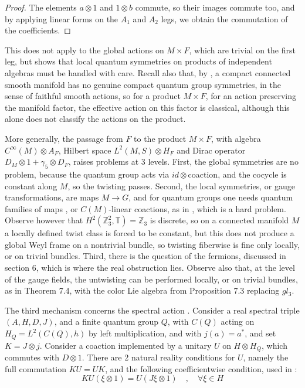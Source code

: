 \documentclass[11pt]{amsart}
\theoremstyle{definition}
\begin{document}
\begin{proof}
The elements $a\otimes1$ and $1\otimes b$ commute, so their images commute too, and by applying linear forms on the $A_1$ and $A_2$ legs, we obtain the commutation of the coefficients.
\end{proof}

This does not apply to the global actions on $M\times F$, which are trivial on the first leg, but shows that local quantum symmetries on products of independent algebras must be handled with care. Recall also that, by \cite{gsw}, a compact connected smooth manifold has no genuine compact quantum group symmetries, in the sense of faithful smooth actions, so for a product $M\times F$, for an action preserving the manifold factor, the effective action on this factor is classical, although this alone does not classify the actions on the product.

More generally, the passage from $F$ to the product $M\times F$, with algebra $C^\infty(M)\otimes A_F$, Hilbert space $L^2(M,S)\otimes H_F$ and Dirac operator $D_M\otimes1+\gamma_5\otimes D_F$, raises problems at 3 levels. First, the global symmetries are no problem, because the quantum group acts via $id\otimes$coaction, and the cocycle is constant along $M$, so the twisting passes. Second, the local symmetries, or gauge transformations, are maps $M\to G$, and for quantum groups one needs quantum families of maps \cite{sol}, or $C(M)$-linear coactions, as in \cite{bddd}, which is a hard problem. Observe however that $H^2(\mathbb Z_3^2,\mathbb T)=\mathbb Z_3$ is discrete, so on a connected manifold $M$ a locally defined twist class is forced to be constant, but this does not produce a global Weyl frame on a nontrivial bundle, so twisting fiberwise is fine only locally, or on trivial bundles. Third, there is the question of the fermions, discussed in section 6, which is where the real obstruction lies. Observe also that, at the level of the gauge fields, the untwisting can be performed locally, or on trivial bundles, as in Theorem 7.4, with the color Lie algebra from Proposition 7.3 replacing $gl_3$.

The third mechanism concerns the spectral action \cite{cc2}. Consider a real spectral triple $(A,H,D,J)$, and a finite quantum group $Q$, with $C(Q)$ acting on $H_Q=L^2(C(Q),h)$ by left multiplication, and with $j(a)=a^*$, and set $K=J\otimes j$. Consider a coaction implemented by a unitary $U$ on $H\otimes H_Q$, which commutes with $D\otimes1$. There are 2 natural reality conditions for $U$, namely the full commutation $KU=UK$, and the following coefficientwise condition, used in \cite[Definition 2.12]{bdd}:
$$KU(\xi\otimes1)=U(J\xi\otimes1)\quad,\quad\forall\xi\in H$$
\end{document}
